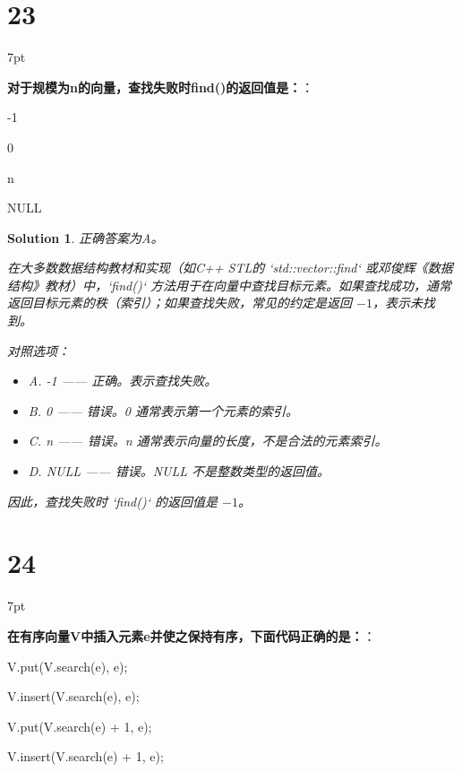 \documentclass[UTF8]{report}
\newtheorem{solution}{Solution}
\theoremstyle{MyLineTheoremStyle} %
\theoremstyle{MyBlockTheoremStyle} %
\theoremstyle{MySubsubsectionStyle} %
\newenvironment{graybox}{%
        \def\FrameCommand{%
        \hspace{1pt}%
        {\color{gray}\small \vrule width 2pt}%
        {\color{graybox_color}\vrule width 4pt}%
        \colorbox{graybox_color}%
        }%
        \MakeFramed{\advance\hsize-\width\FrameRestore}%
        \noindent\hspace{-4.55pt}%
        \begin{adjustwidth}{}{7pt}%
        \vspace{2pt}\vspace{2pt}%
        }
        {%
        \vspace{2pt}\end{adjustwidth}\endMakeFramed%
        }
\begin{document}
\section*{23}

\begin{graybox}
\textbf{对于规模为n的向量，查找失败时find()的返回值是：}：
\begin{circledenum}
    \item -1
    \item 0
    \item n
    \item NULL
\end{circledenum}
\end{graybox}

\begin{solution}
正确答案为A。

在大多数数据结构教材和实现（如C++ STL的 `std::vector::find` 或邓俊辉《数据结构》教材）中，`find()` 方法用于在向量中查找目标元素。如果查找成功，通常返回目标元素的秩（索引）；如果查找失败，常见的约定是返回 $-1$，表示未找到。

对照选项：
\begin{itemize}
    \item A. -1 —— 正确。表示查找失败。
    \item B. 0 —— 错误。0 通常表示第一个元素的索引。
    \item C. n —— 错误。n 通常表示向量的长度，不是合法的元素索引。
    \item D. NULL —— 错误。NULL 不是整数类型的返回值。
\end{itemize}
因此，查找失败时 `find()` 的返回值是 $-1$。
\end{solution}


\section*{24}

\begin{graybox}
\textbf{在有序向量V中插入元素e并使之保持有序，下面代码正确的是：}：
\begin{circledenum}
    \item V.put(V.search(e), e);
    \item V.insert(V.search(e), e);
    \item V.put(V.search(e) + 1, e);
    \item V.insert(V.search(e) + 1, e);
\end{circledenum}
\end{graybox}
\end{document}
